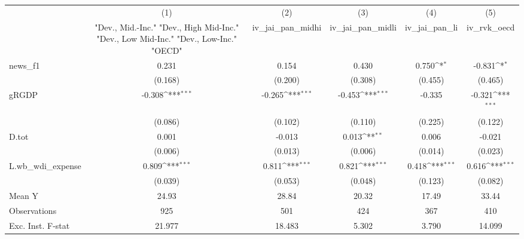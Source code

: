 {
\def\sym#1{\ifmmode^{#1}\else\(^{#1}\)\fi}
\begin{tabular}{l*{5}{c}}
\toprule
            &\multicolumn{1}{c}{(1)}&\multicolumn{1}{c}{(2)}&\multicolumn{1}{c}{(3)}&\multicolumn{1}{c}{(4)}&\multicolumn{1}{c}{(5)}\\
            &\multicolumn{1}{c}{ "Dev., Mid.-Inc." "Dev., High Mid-Inc." "Dev., Low Mid-Inc." "Dev., Low-Inc." "OECD" }&\multicolumn{1}{c}{iv\_jai\_pan\_midhi}&\multicolumn{1}{c}{iv\_jai\_pan\_midli}&\multicolumn{1}{c}{iv\_jai\_pan\_li}&\multicolumn{1}{c}{iv\_rvk\_oecd}\\
\midrule
news\_f1     &       0.231         &       0.154         &       0.430         &       0.750\sym{*}  &      -0.831\sym{*}  \\
            &     (0.168)         &     (0.200)         &     (0.308)         &     (0.455)         &     (0.465)         \\
\addlinespace
gRGDP       &      -0.308\sym{***}&      -0.265\sym{***}&      -0.453\sym{***}&      -0.335         &      -0.321\sym{***}\\
            &     (0.086)         &     (0.102)         &     (0.110)         &     (0.225)         &     (0.122)         \\
\addlinespace
D.tot       &       0.001         &      -0.013         &       0.013\sym{**} &       0.006         &      -0.021         \\
            &     (0.006)         &     (0.013)         &     (0.006)         &     (0.014)         &     (0.023)         \\
\addlinespace
L.wb\_wdi\_expense&       0.809\sym{***}&       0.811\sym{***}&       0.821\sym{***}&       0.418\sym{***}&       0.616\sym{***}\\
            &     (0.039)         &     (0.053)         &     (0.048)         &     (0.123)         &     (0.082)         \\
\midrule
Mean Y      &       24.93         &       28.84         &       20.32         &       17.49         &       33.44         \\
Observations&         925         &         501         &         424         &         367         &         410         \\
Exc. Inst. F-stat&      21.977         &      18.483         &       5.302         &       3.790         &      14.099         \\
\bottomrule
\end{tabular}
}

